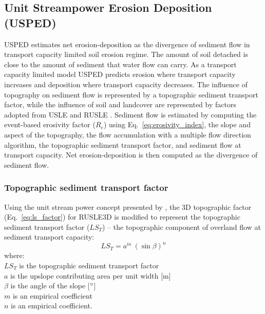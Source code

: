 \documentclass[gmd, manuscript]{copernicus}
\begin{document}
\subsection{Unit Streampower Erosion Deposition (USPED)} \label{usped_model}
USPED estimates net erosion-deposition as the divergence of sediment flow
in transport capacity limited soil erosion regime.
The amount of soil detached is 
close to the amount of sediment that water flow can carry.
As a transport capacity limited model
USPED predicts erosion where transport capacity increases
and deposition where transport capacity decreases. 
The influence of topography on sediment flow  
is represented by a topographic sediment transport factor,
while the influence of soil and landcover are represented by 
factors adopted from USLE and RUSLE
\citep{Mitasova1996}.
%
Sediment flow is estimated by computing
the event-based erosivity factor ($R_e$) 
using Eq.~\ref{eq:erosivity_index},
the slope and aspect of the topography,
the flow accumulation with a multiple flow direction algorithm,
the topographic sediment transport factor,
and sediment flow at transport capacity.
Net erosion-deposition is then computed as the divergence of sediment flow. 

\subsubsection{Topographic sediment transport factor}
Using the unit stream power concept presented by \cite{Moore1986},
the 3D topographic factor (Eq.~\ref{eq:ls_factor}) 
for RUSLE3D is modified to represent 
the topographic sediment transport factor ($LS_T$) --
the topographic component 
of overland flow at sediment transport capacity:
%
\begin{equation}
\label{eq:lst_factor}
{LS_T = a^{m} ~ (\sin \beta)^{n}}
\end{equation}
%
{\small
\noindent
where: \\
\noindent
\hspace*{0.5em} $LS_T$ is the topographic sediment transport factor\\
\hspace*{0.5em} $a$ is the upslope contributing area per unit width [\unit{m}]\\
\hspace*{0.5em} $\beta$ is the angle of the slope [$^{\circ}$]\\
\hspace*{0.5em} $m$ is an empirical coefficient\\
\hspace*{0.5em} $n$ is an empirical coefficient.\\
}
\end{document}
